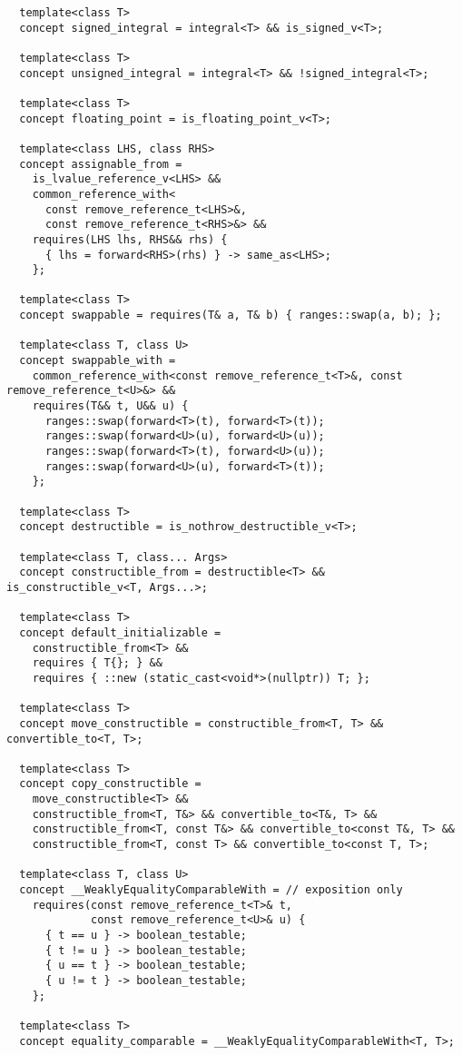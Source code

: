 \begin{verbatim}
  template<class T>
  concept signed_integral = integral<T> && is_signed_v<T>;

  template<class T>
  concept unsigned_integral = integral<T> && !signed_integral<T>;

  template<class T>
  concept floating_point = is_floating_point_v<T>;

  template<class LHS, class RHS>
  concept assignable_from =
    is_lvalue_reference_v<LHS> &&
    common_reference_with<
      const remove_reference_t<LHS>&,
      const remove_reference_t<RHS>&> &&
    requires(LHS lhs, RHS&& rhs) {
      { lhs = forward<RHS>(rhs) } -> same_as<LHS>;
    };

  template<class T>
  concept swappable = requires(T& a, T& b) { ranges::swap(a, b); };

  template<class T, class U>
  concept swappable_with =
    common_reference_with<const remove_reference_t<T>&, const remove_reference_t<U>&> &&
    requires(T&& t, U&& u) {
      ranges::swap(forward<T>(t), forward<T>(t));
      ranges::swap(forward<U>(u), forward<U>(u));
      ranges::swap(forward<T>(t), forward<U>(u));
      ranges::swap(forward<U>(u), forward<T>(t));
    };

  template<class T>
  concept destructible = is_nothrow_destructible_v<T>;

  template<class T, class... Args>
  concept constructible_from = destructible<T> && is_constructible_v<T, Args...>;

  template<class T>
  concept default_initializable =
    constructible_from<T> &&
    requires { T{}; } &&
    requires { ::new (static_cast<void*>(nullptr)) T; };

  template<class T>
  concept move_constructible = constructible_from<T, T> && convertible_to<T, T>;

  template<class T>
  concept copy_constructible =
    move_constructible<T> &&
    constructible_from<T, T&> && convertible_to<T&, T> &&
    constructible_from<T, const T&> && convertible_to<const T&, T> &&
    constructible_from<T, const T> && convertible_to<const T, T>;

  template<class T, class U>
  concept __WeaklyEqualityComparableWith = // exposition only
    requires(const remove_reference_t<T>& t,
             const remove_reference_t<U>& u) {
      { t == u } -> boolean_testable;
      { t != u } -> boolean_testable;
      { u == t } -> boolean_testable;
      { u != t } -> boolean_testable;
    };
 
  template<class T>
  concept equality_comparable = __WeaklyEqualityComparableWith<T, T>;


\end{verbatim}
